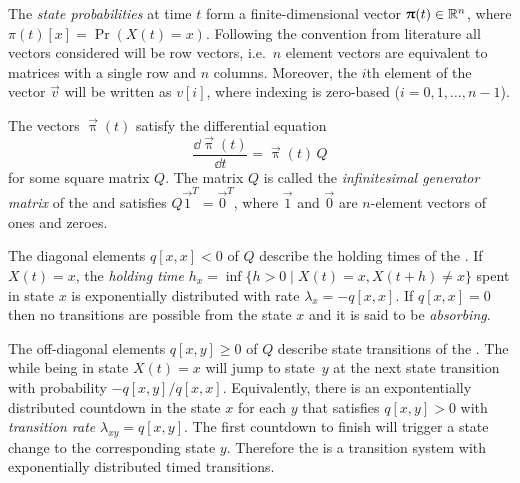 The \emph{state probabilities} at time $t$ form a finite-dimensional vector \(\bm{\mathrm{\uppi}}(t) \in \mathbb{R}^n\), where \(\pi(t)[x] = \Pr(X(t) = x)\). Following the convention from  literature all vectors considered will be row vectors, i.e.~\(n\) element vectors are equivalent to matrices with a single row and \(n\) columns. Moreover, the \(i\)th element of the vector \(\vec{v}\) will be written as \(v[i]\), where indexing is zero-based (\(i = 0, 1, \ldots, n - 1\)).

The vectors \(\vec{\uppi}(t)\) satisfy the differential equation
\begin{equation}
  \label{eq:background:ctmc-diffeq}
  \frac{\dd \vec{\uppi}(t)}{\dd t} = \vec{\uppi}(t) \, Q
\end{equation}
for some square matrix $Q$. The matrix $Q$ is called the \emph{infinitesimal generator matrix} of the  and satisfies \(Q \vec{1}^T = \vec{0}^T\), where \(\vec{1}\) and \(\vec{0}\) are \(n\)-element vectors of ones and zeroes.

The diagonal elements \(q[x, x] < 0\) of \(Q\) describe the holding times of the . If \(X(t) = x\), the \emph{holding time} \(h_x = \inf \{ h > 0 \mid X(t) = x, X(t + h) \ne x \}\) spent in state \(x\) is exponentially distributed with rate \(\lambda_x = -q[x, x]\). If \(q[x, x] = 0\) then no transitions are possible from the state $x$ and it is said to be \emph{absorbing}.

The off-diagonal elements \(q[x, y] \ge 0\) of \(Q\) describe state transitions of the . The  while being in state \(X(t) = x\) will jump to state~\(y\) at the next state transition with probability \(-q[x, y] / q[x, x]\). Equivalently, there is an expontentially distributed countdown in the state \(x\) for each \(y\) that satisfies \(q[x, y] > 0\) with \emph{transition rate} $\lambda_{xy} = q[x, y]$. The first countdown to finish will trigger a state change to the corresponding state \(y\). Therefore the  is a transition system with exponentially distributed timed transitions.

